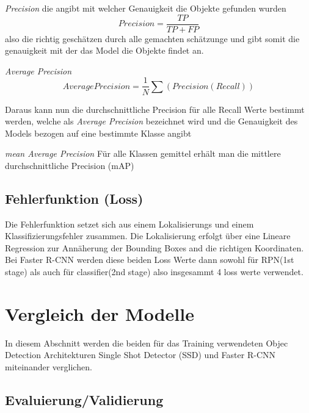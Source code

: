 \textit{Precision}
die angibt mit welcher Genauigkeit die Objekte gefunden wurden
\begin{equation}
  Precision = \frac{TP}{TP + FP}
\end{equation}
also die richtig 
geschätzen durch alle gemachten schätzunge und gibt somit die 
genauigkeit mit der das Model die Objekte findet an.


\textit{Average Precision}
\begin{equation}
  Average Precision = \frac{1}{N}\sum(Precision(Recall))
\end{equation}

Daraus kann nun die durchschnittliche Precision für alle Recall 
Werte bestimmt werden, welche als \textit{Average Precision}
bezeichnet wird und die Genauigkeit des Models bezogen auf 
eine bestimmte Klasse angibt

\textit{mean Average Precision}
Für alle Klassen gemittel 
erhält man die mittlere durchschnittliche Precision (mAP)



\subsection*{Fehlerfunktion (Loss)}
Die Fehlerfunktion setzet sich aus einem Lokalisierungs und einem 
Klassifizierungsfehler zusammen. 
Die Lokalisierung erfolgt über eine Lineare Regression zur 
Annäherung der Bounding Boxes and die richtigen Koordinaten.\\

Bei Faster R-CNN werden diese beiden Loss Werte dann sowohl für 
RPN(1st stage) als auch für classifier(2nd stage) also 
insgesammt 4 loss werte verwendet.



\section{Vergleich der Modelle}\label{sec:model_vergleich}
In diesem Abschnitt werden die beiden für das Training verwendeten
Objec Detection Architekturen Single Shot Detector (SSD)
und Faster R-CNN miteinander verglichen.



\subsection{Evaluierung/Validierung}

